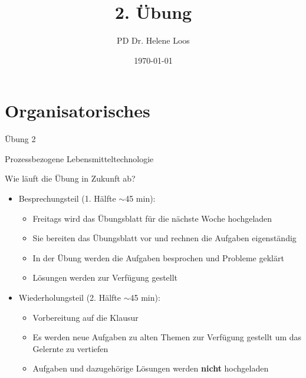 \documentclass[aspectratio=169,9pt]{beamer}
\title{2. Übung}
\author{PD Dr. Helene Loos}
\date{\today}
\newcommand{\RA}{$\rightarrow$~}
\newcommand{\pp}{\par \vspace*{2mm}}
\begin{document}
\small





\section{Organisatorisches}
\begin{frame}

\begin{center}

\Huge 
Übung 2
\pp
\small
Prozessbezogene Lebensmitteltechnologie
\end{center}

\end{frame}



\begin{frame}
\Large Wie läuft die Übung in Zukunft ab?
\pp
\normalsize
\begin{itemize}
\item Besprechungsteil (1. Hälfte $\sim$45 min):
\begin{itemize}

\item Freitags wird das Übungsblatt für die nächste Woche hochgeladen
\item Sie bereiten das Übungsblatt vor und rechnen die Aufgaben eigenständig
\item In der Übung werden die Aufgaben besprochen und Probleme geklärt
\item Lösungen werden zur Verfügung gestellt

\end{itemize}
\pp
\item Wiederholungsteil (2. Hälfte $\sim$45 min):
\begin{itemize}
\item Vorbereitung auf die Klausur
\item Es werden neue Aufgaben zu alten Themen zur Verfügung gestellt um das Gelernte zu vertiefen
\item Aufgaben und dazugehörige Lösungen werden \textbf{nicht} hochgeladen
\end{itemize}
\end{itemize}
\end{frame}

%
%
\end{document}
